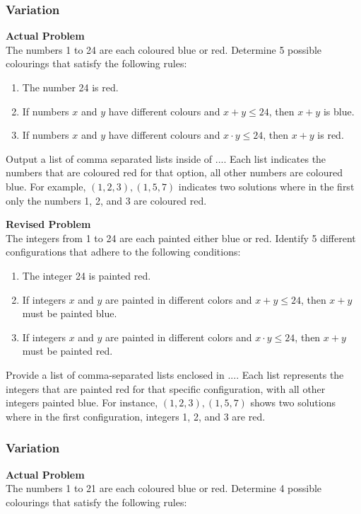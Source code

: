 \subsubsection{Variation}
\textbf{Actual Problem}\\
The numbers 1 to 24 are each coloured blue or red. Determine 5 possible colourings that satisfy the following rules:

\begin{enumerate}
\item The number 24 is red.
\item If numbers $x$ and $y$ have different colours and $x + y \leqslant 24$, then $x + y$ is blue.
\item If numbers $x$ and $y$ have different colours and $x \cdot y \leqslant 24$, then $x + y$ is red.
\end{enumerate}

Output a list of comma separated lists inside of $\boxed{...}$. Each list indicates the numbers that are coloured red for that option, all other numbers are coloured blue. For example, $\boxed{(1,2,3),(1,5,7)}$ indicates two solutions where in the first only the numbers 1, 2, and 3 are coloured red. 

\textbf{Revised Problem}\\
The integers from 1 to 24 are each painted either blue or red. Identify 5 different configurations that adhere to the following conditions:

\begin{enumerate}
\item The integer 24 is painted red.
\item If integers $x$ and $y$ are painted in different colors and $x + y \leqslant 24$, then $x + y$ must be painted blue.
\item If integers $x$ and $y$ are painted in different colors and $x \cdot y \leqslant 24$, then $x + y$ must be painted red.
\end{enumerate}

Provide a list of comma-separated lists enclosed in $\boxed{...}$. Each list represents the integers that are painted red for that specific configuration, with all other integers painted blue. For instance, $\boxed{(1,2,3),(1,5,7)}$ shows two solutions where in the first configuration, integers 1, 2, and 3 are red.

\subsubsection{Variation}
\textbf{Actual Problem}\\
The numbers 1 to 21 are each coloured blue or red. Determine 4 possible colourings that satisfy the following rules:

